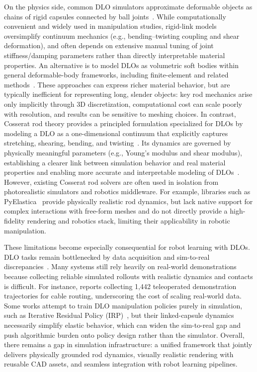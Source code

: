 \documentclass[letterpaper, 10 pt, conference]{ieeeconf}  %
\begin{document}
On the physics side, common DLO simulators approximate deformable objects as chains of rigid capsules connected by ball joints~\cite{DexDLO, irp, R2S2R}. While computationally convenient and widely used in manipulation studies, rigid-link models oversimplify continuum mechanics (e.g., bending--twisting coupling and shear deformation), and often depends on extensive manual tuning of joint stiffness/damping parameters rather than directly interpretable material properties. An alternative is to model DLOs as volumetric soft bodies within general deformable-body frameworks, including finite-element and related methods~\cite{kaufmann2009flexible, wang2013efficient, lv2017physically, valentini2011modeling}. These approaches can express richer material behavior, but are typically inefficient for representing long, slender objects: key rod mechanics arise only implicitly through 3D discretization, computational cost can scale poorly with resolution, and results can be sensitive to meshing choices. In contrast, Cosserat rod theory provides a principled formulation specialized for DLOs by modeling a DLO as a one-dimensional continuum that explicitly captures stretching, shearing, bending, and twisting~\cite{cosserat_theory, linn2017discrete, cosserat_multisection}. Its dynamics are governed by physically meaningful parameters (e.g., Young's modulus and shear modulus), establishing a clearer link between simulation behavior and real material properties and enabling more accurate and interpretable modeling of DLOs~\cite{cable_modeling_review}. However, existing Cosserat rod solvers are often used in isolation from photorealistic simulators and robotics middleware. For example, libraries such as PyElastica~\cite{pyelastica_paper} provide physically realistic rod dynamics, but lack native support for complex interactions with free-form meshes and do not directly provide a high-fidelity rendering and robotics stack, limiting their applicability in robotic manipulation.

These limitations become especially consequential for robot learning with DLOs. DLO tasks remain bottlenecked by data acquisition and sim-to-real discrepancies~\cite{R2S2R, routing}. Many systems still rely heavily on real-world demonstrations because collecting reliable simulated rollouts with realistic dynamics and contacts is difficult. For instance, \cite{routing} reports collecting 1{,}442 teleoperated demonstration trajectories for cable routing, underscoring the cost of scaling real-world data. Some works attempt to train DLO manipulation policies purely in simulation, such as Iterative Residual Policy (IRP)~\cite{irp}, but their linked-capsule dynamics necessarily simplify elastic behavior, which can widen the sim-to-real gap and push algorithmic burden onto policy design rather than the simulator. Overall, there remains a gap in simulation infrastructure: a unified framework that jointly delivers physically grounded rod dynamics, visually realistic rendering with reusable CAD assets, and seamless integration with robot learning pipelines.
\end{document}
